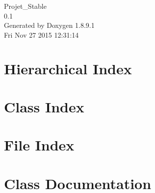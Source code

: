 \documentclass[twoside]{book}
\newcommand{\+}{\discretionary{\mbox{\scriptsize$\hookleftarrow$}}{}{}}
\newcommand{\clearemptydoublepage}{%
  \newpage{\pagestyle{empty}\cleardoublepage}%
}
\begin{document}
\hypersetup{pageanchor=false,
             bookmarks=true,
             bookmarksnumbered=true,
             pdfencoding=unicode
            }
\begin{titlepage}
\vspace*{7cm}
\begin{center}%
{\Large Projet\+\_\+\+Stable \\[1ex]\large 0.\+1 }\\
\vspace*{1cm}
{\large Generated by Doxygen 1.8.9.1}\\
\vspace*{0.5cm}
{\small Fri Nov 27 2015 12:31:14}\\
\end{center}
\end{titlepage}
\clearemptydoublepage
\tableofcontents
\clearemptydoublepage
{}
\hypersetup{pageanchor=true}

\chapter{Hierarchical Index}

\chapter{Class Index}

\chapter{File Index}

\chapter{Class Documentation}














\end{document}
